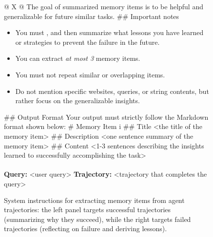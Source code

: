 \begin{figure}[htbp]
\begin{minipage}[t]{0.475\textwidth}
\begin{tabularx}{\linewidth}{@{} X @{}}
            \newline
            The goal of summarized memory items is to be helpful and generalizable for future similar tasks.
            \newline\newline
            \#\# Important notes
            \begin{itemize}[label=--, leftmargin=1.2em, itemsep=0.15em, topsep=0.2em]
                \item You must , and then summarize what lessons you have learned or strategies to prevent the failure in the future.
                \item You can extract \textit{at most 3} memory items.
                \item You must not repeat similar or overlapping items.
                \item Do not mention specific websites, queries, or string contents, but rather focus on the generalizable insights.
            \end{itemize}
            \vspace{0.3em}
            \#\# Output Format
            \newline
            Your output must strictly follow the Markdown format shown below:
            \newline
            \bt
            \newline\newline
            \# Memory Item i
            \newline
            \#\# Title \textless the title of the memory item\textgreater{}
            \newline
            \#\# Description \textless one sentence summary of the memory item\textgreater{}
            \newline
            \#\# Content \textless 1-3 sentences describing the insights learned to successfully accomplishing the task\textgreater{} \bt
            \\
            \midrule
             \\
            \midrule
            \textbf{Query:} \textless user query\textgreater{}
            \newline\newline
            \textbf{Trajectory:} \textless trajectory that completes the query\textgreater{}
            \\
            \bottomrule
        \end{tabularx}%
    \end{minipage}%
    \caption{System instructions for extracting memory items from agent trajectories: the left panel targets successful trajectories (summarizing why they succeed), while the right targets failed trajectories (reflecting on failure and deriving lessons).}
    \label{fig:memory-extraction-prompts}
\end{figure}

